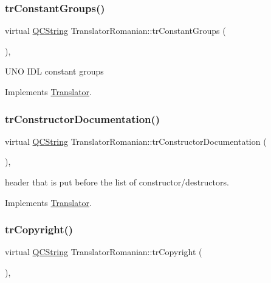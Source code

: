 \subsubsection{\texorpdfstring{trConstantGroups()}{trConstantGroups()}}
{\footnotesize\ttfamily virtual \mbox{\hyperlink{class_q_c_string}{Q\+C\+String}} Translator\+Romanian\+::tr\+Constant\+Groups (\begin{DoxyParamCaption}{ }\end{DoxyParamCaption})\hspace{0.3cm}{\ttfamily [inline]}, {\ttfamily [virtual]}}

U\+NO I\+DL constant groups 

Implements \mbox{\hyperlink{class_translator}{Translator}}.

\mbox{\label{class_translator_romanian_a67ac1af67452087cbd780fb4fa733318}} 
\subsubsection{\texorpdfstring{trConstructorDocumentation()}{trConstructorDocumentation()}}
{\footnotesize\ttfamily virtual \mbox{\hyperlink{class_q_c_string}{Q\+C\+String}} Translator\+Romanian\+::tr\+Constructor\+Documentation (\begin{DoxyParamCaption}{ }\end{DoxyParamCaption})\hspace{0.3cm}{\ttfamily [inline]}, {\ttfamily [virtual]}}

header that is put before the list of constructor/destructors. 

Implements \mbox{\hyperlink{class_translator}{Translator}}.

\mbox{\label{class_translator_romanian_a45a87348efa6dd7c8faeb207e5f7a039}} 
\subsubsection{\texorpdfstring{trCopyright()}{trCopyright()}}
{\footnotesize\ttfamily virtual \mbox{\hyperlink{class_q_c_string}{Q\+C\+String}} Translator\+Romanian\+::tr\+Copyright (\begin{DoxyParamCaption}{ }\end{DoxyParamCaption})\hspace{0.3cm}{\ttfamily [inline]}, {\ttfamily [virtual]}}

